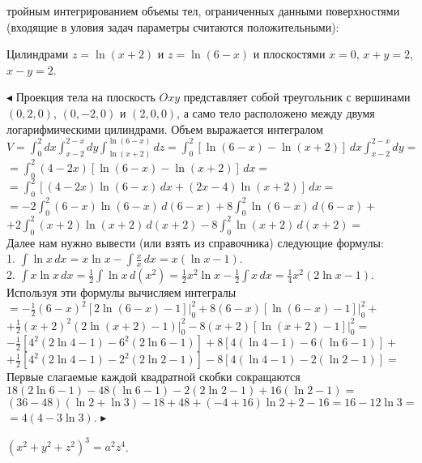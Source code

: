 \documentclass[a5paper,10pt]{article}
\begin{document}
\medskip
{} тройным интегрированием объемы тел, ограниченных данными поверхностями (входящие в уловия задач параметры считаются положительными):

\medskip
{} Цилиндрами $z=\ln(x+2)$ и $z=\ln(6-x)$ и плоскостями $x=0$, $x+y=2$, $x-y=2$.

\smallskip
\noindent $\blacktriangleleft$ Проекция тела на плоскость $Oxy$ представляет собой треугольник
с вершинами $(0,2,0)$, $(0,-2,0)$ и $(2,0,0)$, а само тело расположено между двумя логарифмическими
цилиндрами. Объем выражается интегралом\\
$\displaystyle V=\int_0^2dx\int_{x-2}^{2-x}dy\int_{\ln(x+2)}^{\ln(6-x)}dz=
\int_0^2[\ln(6-x)-\ln(x+2)]\,dx\int_{x-2}^{2-x}dy=$\\
$\displaystyle =\int_0^2(4-2x)[\ln(6-x)-\ln(x+2)]\,dx=$\\
$\displaystyle =\int_0^2[(4-2x)\ln(6-x)\,dx+(2x-4)\ln(x+2)]\,dx=$\\
$\displaystyle =-2\int_0^2(6-x)\ln(6-x)\,d(6-x)+8\int_0^2\ln(6-x)\,d(6-x)+$\\
$\displaystyle +2\int_0^2(x+2)\ln(x+2)\,d(x+2)-8\int_0^2\ln(x+2)\,d(x+2)=$\\
Далее нам нужно вывести (или взять из справочника) следующие формулы:\\
1. $\displaystyle\int\ln x\,dx=x\ln x-\int\frac xx\,dx=x(\ln x-1)$.\\
2. $\displaystyle\int x\ln x\,dx=\frac12\int\ln x\,d(x^2)=\frac12x^2\ln x-\frac12\int x\,dx=\frac14x^2(2\ln x-1)$.\\
Используя эти формулы вычисляем интегралы\\
$\displaystyle =-\frac12(6-x)^2[2\ln(6-x)-1]\Big|_0^2+8(6-x)[\ln(6-x)-1]\Big|_0^2+$\\
$\displaystyle +\frac12(x+2)^2(2\ln(x+2)-1)\Big|_0^2-8(x+2)[\ln(x+2)-1]\Big|_0^2=$\\
$\displaystyle -\frac12[4^2(2\ln4-1)-6^2(2\ln6-1)]+8[4(\ln4-1)-6(\ln6-1)]+$\\
$\displaystyle +\frac12[4^2(2\ln4-1)-2^2(2\ln2-1)]-8[4(\ln4-1)-2(\ln2-1)]=$\\
Первые слагаемые каждой квадратной скобки сокращаются\\
$18(2\ln6-1)-48(\ln6-1)-2(2\ln2-1)+16(\ln2-1)=$\\
$(36-48)(\ln2+\ln3)-18+48+(-4+16)\ln2+2-16=16-12\ln3=$\\
$=4(4-3\ln3).$ $\blacktriangleright$

\medskip
{} $(x^2+y^2+z^2)^3=a^2z^4$.
\end{document}
